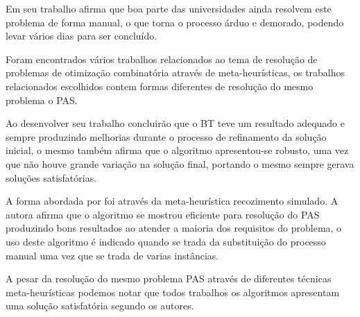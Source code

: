 \documentclass{abntpuc}
\begin{document}
Em seu trabalho \cite{souza2000} afirma que boa parte das universidades ainda resolvem este problema de forma manual, o que torna o processo árduo e demorado, podendo levar vários dias para ser concluído.\par




Foram encontrados vários trabalhos relacionados ao tema de resolução de problemas de otimização combinatória através de meta-heurísticas, os trabalhos relacionados escolhidos contem formas diferentes de resolução do mesmo problema o PAS.\par

Ao desenvolver seu trabalho \cite{subramanian2006aplicaccao} concluirão que o BT teve um resultado adequado e sempre produzindo melhorias durante o processo de refinamento da solução inicial, o mesmo também afirma que o algoritmo apresentou-se robusto, uma vez que não houve grande variação na solução final, portando o mesmo sempre gerava soluções satisfatórias.

A forma abordada por \cite{silva2005estudo} foi através da meta-heurística recozimento simulado. A autora afirma que o algoritmo se mostrou eficiente para resolução do PAS produzindo bons resultados ao atender a maioria dos requisitos do problema, o uso deste algoritmo é indicado quando se trada da substituição do processo manual uma vez que se trada de varias instâncias.



A pesar da resolução do mesmo problema PAS através de diferentes técnicas meta-heurísticas podemos notar que todos trabalhos os algoritmos apresentam uma solução satisfatória segundo os autores.\par







\end{document}
